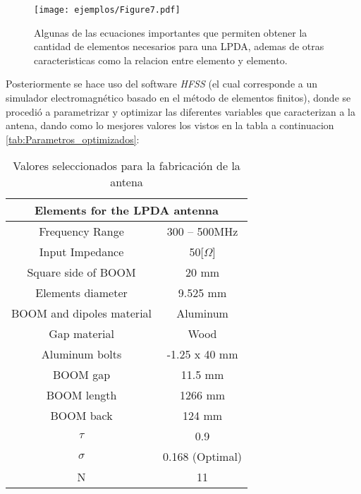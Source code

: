 \begin{figure}
	\centering
	\texttt{[image: ejemplos/Figure7.pdf]}
	\caption{Algunas de las ecuaciones importantes que permiten obtener la cantidad de elementos necesarios para una LPDA, ademas de otras caracteristicas como la relacion entre elemento y elemento.}
	\label{fig:esqumea_antena}
\end{figure}
Posteriormente se hace uso del software \textit{HFSS} (el cual corresponde a un simulador electromagnético basado en el método de elementos finitos), donde se procedió a parametrizar y optimizar las diferentes variables que caracterizan a la antena, dando como lo mesjores valores los vistos en la tabla a continuacion \ref{tab:Parametros_optimizados}:
\begin{table}
    \captionsetup{position=below}
    \footnotesize
    \label{tab:antenna-parameters11}
    \begin{subtable}[b]{0.45\linewidth}
        \centering
        \begin{tabular}{cc}
            \multicolumn{2}{c}{Elements for the LPDA antenna} \\
            \hline
            Frequency Range & 300 -- 500MHz \\
            Input Impedance & 50[$\Omega$] \\
            Square side of BOOM & 20 mm \\
            Elements diameter & 9.525 mm \\
            BOOM and dipoles material & Aluminum \\
            Gap material & Wood \\
            Aluminum bolts & -1.25 x 40 mm \\
            BOOM gap & 11.5 mm \\
            BOOM length & 1266 mm \\
            BOOM back & 124 mm \\
            $\tau$ & 0.9 \\
            $\sigma$ & 0.168 (Optimal) \\
            N & 11 \\
        \end{tabular}
        \caption{Valores seleccionados para la fabricación de la antena}
        \label{tab:caracteristicas_generales}
    \end{subtable}%
    \hspace{1cm} %
    \begin{subtable}[b]{0.45\linewidth}

\end{subtable}
\end{table}
